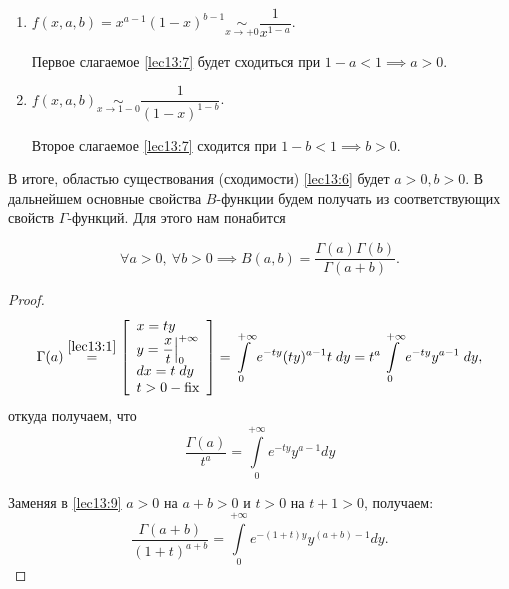 \documentclass[../../main.tex]{subfiles}
\begin{document}
\begin{enumerate}
 \item $\displaystyle f(x, a, b) = x^{a-1}(1-x)^{b-1} \underset{x\to+0}\sim \dfrac{1}{x^{1-a}}$.
 
  Первое слагаемое \eqref{lec13:7} будет сходиться при $1 - a < 1 \implies a > 0$.
  \item $f(x, a, b) \underset{x\to1-0}\sim \dfrac{1}{(1-x)^{1-b}}$.
  
  Второе слагаемое \eqref{lec13:7} сходится при $1-b < 1 \implies b > 0$.
\end{enumerate}

В итоге, областью существования (сходимости) \eqref{lec13:6} будет $a > 0, b > 0$.
В дальнейшем основные свойства $B$-функции будем получать из соответствующих свойств $\Gamma$-функций. Для этого нам понабится

\begin{thm}
	\begin{equation}
	\label{lec13:8}
	\forall a > 0,\ \forall b>0 \implies B(a, b) = 
	\dfrac{\Gamma(a)\Gamma(b)}{\Gamma(a+b)}.
	\end{equation}
\end{thm}

\begin{proof}
	\[\Gamma(a) \stk{lec13:1}= \left[
	\begin{array}{l}
    x=ty \\
    y = \dfrac{x}{t}\Big|^{+\infty}_0 \\
    dx = t\; dy \\
    t > 0 - \fix
	\end{array}\right] = 
	\int\limits_0^{+\infty}e^{-ty}(ty)^{a-1}t\;dy = t^a 
	\int\limits_0^{+\infty}e^{-ty}y^{a-1}\;dy,\]
	откуда получаем, что
	\begin{equation}
		\label{lec13:9}
		\dfrac{\Gamma(a)}{t^a}=\int\limits_0^{+\infty}e^{-ty}y^{a-1}dy
	\end{equation}
	
	Заменяя в \eqref{lec13:9} $a > 0$ на $a+b > 0$ и $t > 0$ на $t+1 > 0$, 
	получаем:
	\begin{equation}
	\label{lec13:10}
	\dfrac{\Gamma(a+b)}{(1+t)^{a+b}} = \int\limits_0^{+\infty} e^{-(1+t)y} 
	y^{(a+b) - 
	1} dy.
	\end{equation}
\end{proof}
\end{document}
